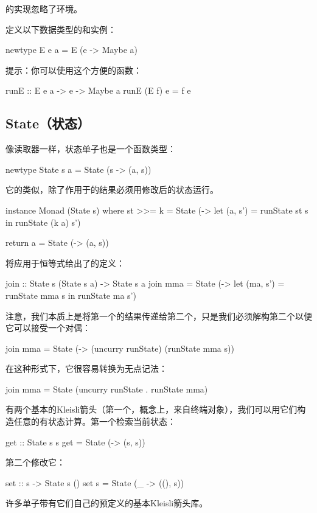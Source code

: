 \documentclass[DaoFP]{subfiles}
\begin{document}
    的实现忽略了环境。

    \begin{exercise}
        定义以下数据类型的和实例：
        \begin{haskell}
            newtype E e a = E (e -> Maybe a)
        \end{haskell}
        提示：你可以使用这个方便的函数：
        \begin{haskell}
            runE :: E e a -> e -> Maybe a
            runE (E f) e = f e
        \end{haskell}
    \end{exercise}

    \subsection{State（状态）}
    像读取器一样，状态单子也是一个函数类型：
    \begin{haskell}
        newtype State s a = State (s -> (a, s))
    \end{haskell}
    它的类似，除了作用于的结果必须用修改后的状态运行。
    \begin{haskell}
        instance Monad (State s) where
        st >>= k = State (\s -> let (a, s') = runState st s
        in runState (k a) s')

        return a = State (\s -> (a, s))
    \end{haskell}

    将应用于恒等式给出了的定义：
    \begin{haskell}
        join :: State s (State s a) -> State s a
        join mma = State (\s -> let (ma, s') = runState mma s
        in runState ma s')
    \end{haskell}
    注意，我们本质上是将第一个的结果传递给第二个，只是我们必须解构第二个以便它可以接受一个对偶：
    \begin{haskell}
        join mma = State (\s -> (uncurry runState) (runState mma s))
    \end{haskell}
    在这种形式下，它很容易转换为无点记法：
    \begin{haskell}
        join mma = State (uncurry runState . runState mma)
    \end{haskell}

    有两个基本的Kleisli箭头（第一个，概念上，来自终端对象\hask{()}），我们可以用它们构造任意的有状态计算。第一个检索当前状态：
    \begin{haskell}
        get :: State s s
        get = State (\s -> (s, s))
    \end{haskell}
    第二个修改它：
    \begin{haskell}
        set :: s -> State s ()
        set s = State (\_ -> ((), s))
    \end{haskell}
    许多单子带有它们自己的预定义的基本Kleisli箭头库。
\end{document}
